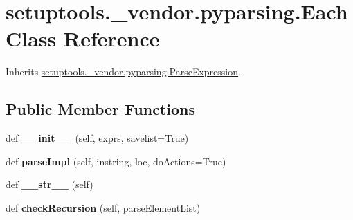 \hypertarget{classsetuptools_1_1__vendor_1_1pyparsing_1_1_each}{}\section{setuptools.\+\_\+vendor.\+pyparsing.\+Each Class Reference}
\label{classsetuptools_1_1__vendor_1_1pyparsing_1_1_each}


Inherits \hyperlink{classsetuptools_1_1__vendor_1_1pyparsing_1_1_parse_expression}{setuptools.\+\_\+vendor.\+pyparsing.\+Parse\+Expression}.

\subsection*{Public Member Functions}
\begin{DoxyCompactItemize}
\item 
\mbox{\label{classsetuptools_1_1__vendor_1_1pyparsing_1_1_each_af875a9988c483efdc95ddf58f94b9052}} 
def {\bfseries \+\_\+\+\_\+init\+\_\+\+\_\+} (self, exprs, savelist=True)
\item 
\mbox{\label{classsetuptools_1_1__vendor_1_1pyparsing_1_1_each_afa07aacae6a3650b417e164970b9fdc8}} 
def {\bfseries parse\+Impl} (self, instring, loc, do\+Actions=True)
\item 
\mbox{\label{classsetuptools_1_1__vendor_1_1pyparsing_1_1_each_a25fd9d64f5e07394f7612cf7c5a3bb72}} 
def {\bfseries \+\_\+\+\_\+str\+\_\+\+\_\+} (self)
\item 
\mbox{\label{classsetuptools_1_1__vendor_1_1pyparsing_1_1_each_aaf13836b8856390839ae5025f3424af6}} 
def {\bfseries check\+Recursion} (self, parse\+Element\+List)
\end{DoxyCompactItemize}
